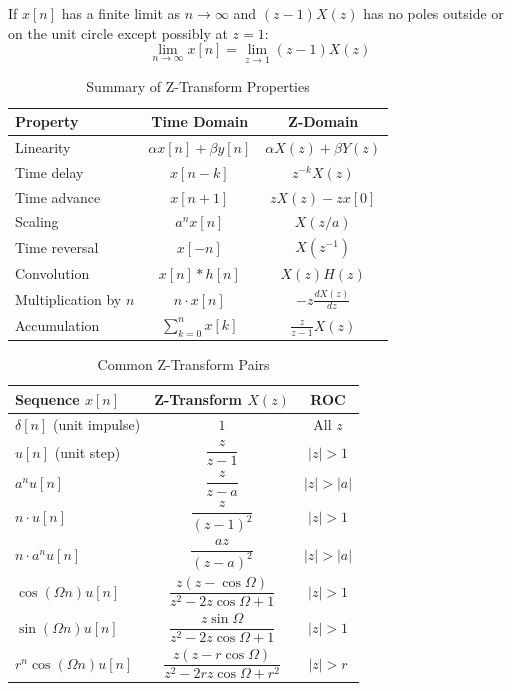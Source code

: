\begin{theorem}
If $x[n]$ has a finite limit as $n \to \infty$ and $(z-1)X(z)$ has no poles outside or on the unit circle except possibly at $z=1$:
\begin{equation}
\lim_{n \to \infty} x[n] = \lim_{z \to 1} (z-1) X(z)
\end{equation}
\end{theorem}

\begin{table}[H]
\centering
\caption{Summary of Z-Transform Properties}
\begin{tabular}{lcc}
\toprule
\textbf{Property} & \textbf{Time Domain} & \textbf{Z-Domain} \\
\midrule
Linearity & $\alpha x[n] + \beta y[n]$ & $\alpha X(z) + \beta Y(z)$ \\
Time delay & $x[n-k]$ & $z^{-k} X(z)$ \\
Time advance & $x[n+1]$ & $z X(z) - z x[0]$ \\
Scaling & $a^n x[n]$ & $X(z/a)$ \\
Time reversal & $x[-n]$ & $X(z^{-1})$ \\
Convolution & $x[n] * h[n]$ & $X(z) H(z)$ \\
Multiplication by $n$ & $n \cdot x[n]$ & $-z \frac{dX(z)}{dz}$ \\
Accumulation & $\sum_{k=0}^{n} x[k]$ & $\frac{z}{z-1} X(z)$ \\
\bottomrule
\end{tabular}
\end{table}

\begin{table}[H]
\centering
\caption{Common Z-Transform Pairs}
\begin{tabular}{lcc}
\toprule
\textbf{Sequence} $x[n]$ & \textbf{Z-Transform} $X(z)$ & \textbf{ROC} \\
\midrule
$\delta[n]$ (unit impulse) & $1$ & All $z$ \\
$u[n]$ (unit step) & $\dfrac{z}{z-1}$ & $|z| > 1$ \\
$a^n u[n]$ & $\dfrac{z}{z-a}$ & $|z| > |a|$ \\
$n \cdot u[n]$ & $\dfrac{z}{(z-1)^2}$ & $|z| > 1$ \\
$n \cdot a^n u[n]$ & $\dfrac{az}{(z-a)^2}$ & $|z| > |a|$ \\
$\cos(\Omega n) u[n]$ & $\dfrac{z(z-\cos\Omega)}{z^2 - 2z\cos\Omega + 1}$ & $|z| > 1$ \\
$\sin(\Omega n) u[n]$ & $\dfrac{z\sin\Omega}{z^2 - 2z\cos\Omega + 1}$ & $|z| > 1$ \\
$r^n \cos(\Omega n) u[n]$ & $\dfrac{z(z-r\cos\Omega)}{z^2 - 2rz\cos\Omega + r^2}$ & $|z| > r$ \\
\bottomrule
\end{tabular}
\end{table}

